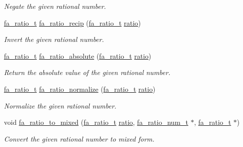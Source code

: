 \begin{DoxyCompactItemize}
\begin{DoxyCompactList}\small\item\em Negate the given rational number. \end{DoxyCompactList}\item 
\hyperlink{group___fa_ratio_gaf3b37b5fdfcccb6283b7ac806c72b273}{fa\-\_\-ratio\-\_\-t} \hyperlink{group___fa_ratio_gae2a0b5d0ca551b62a4a8edc6b399b742}{fa\-\_\-ratio\-\_\-recip} (\hyperlink{group___fa_ratio_gaf3b37b5fdfcccb6283b7ac806c72b273}{fa\-\_\-ratio\-\_\-t} \hyperlink{util_8h_a866d3cbbee2679ec3c34f27a256445de}{ratio})
\begin{DoxyCompactList}\small\item\em Invert the given rational number. \end{DoxyCompactList}\item 
\hyperlink{group___fa_ratio_gaf3b37b5fdfcccb6283b7ac806c72b273}{fa\-\_\-ratio\-\_\-t} \hyperlink{group___fa_ratio_gae3545b10373eeba8414a490e5d9d0ec8}{fa\-\_\-ratio\-\_\-absolute} (\hyperlink{group___fa_ratio_gaf3b37b5fdfcccb6283b7ac806c72b273}{fa\-\_\-ratio\-\_\-t} \hyperlink{util_8h_a866d3cbbee2679ec3c34f27a256445de}{ratio})
\begin{DoxyCompactList}\small\item\em Return the absolute value of the given rational number. \end{DoxyCompactList}\item 
\hyperlink{group___fa_ratio_gaf3b37b5fdfcccb6283b7ac806c72b273}{fa\-\_\-ratio\-\_\-t} \hyperlink{group___fa_ratio_gad477d6485fd4e6ff3bca8bda977447ff}{fa\-\_\-ratio\-\_\-normalize} (\hyperlink{group___fa_ratio_gaf3b37b5fdfcccb6283b7ac806c72b273}{fa\-\_\-ratio\-\_\-t} \hyperlink{util_8h_a866d3cbbee2679ec3c34f27a256445de}{ratio})
\begin{DoxyCompactList}\small\item\em Normalize the given rational number. \end{DoxyCompactList}\item 
void \hyperlink{group___fa_ratio_ga13dc172c048dcd34c04aedd20f0fe1d6}{fa\-\_\-ratio\-\_\-to\-\_\-mixed} (\hyperlink{group___fa_ratio_gaf3b37b5fdfcccb6283b7ac806c72b273}{fa\-\_\-ratio\-\_\-t} \hyperlink{util_8h_a866d3cbbee2679ec3c34f27a256445de}{ratio}, \hyperlink{group___fa_ratio_ga6d6962b946d96535558e341030f16e07}{fa\-\_\-ratio\-\_\-num\-\_\-t} $\ast$, \hyperlink{group___fa_ratio_gaf3b37b5fdfcccb6283b7ac806c72b273}{fa\-\_\-ratio\-\_\-t} $\ast$)
\begin{DoxyCompactList}\small\item\em Convert the given rational number to mixed form. \end{DoxyCompactList}\end{DoxyCompactItemize}


